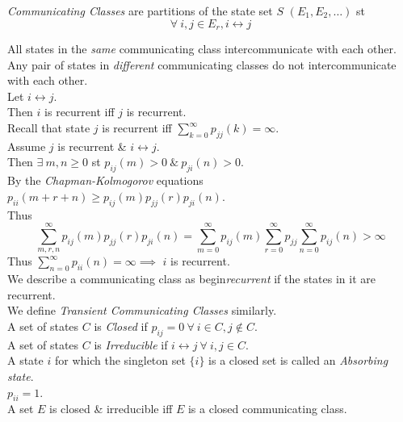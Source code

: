 \documentclass[11pt,a4paper]{article}
\begin{document}
\textit{Communicating Classes} are partitions of the state set $S$ $(E_1,E_2,\dots)$ st
$$\forall\ i,j\in E_r, i\leftrightarrow j$$

All states in the \textit{same} communicating class intercommunicate with each other.\\
Any pair of states in \textit{different} communicating classes do not intercommunicate with each other.\\

Let $i\leftrightarrow j$.\\
Then $i$ is recurrent iff $j$ is recurrent.\\

Recall that state $j$ is recurrent iff $\sum_{k=0}^\infty p_{jj}(k)=\infty$.\\
Assume $j$ is recurrent \& $i\leftrightarrow j$.\\
Then $\exists\ m,n\geq0$ st $p_{ij}(m)>0\ \&\ p_{ji}(n)>0$.\\
By the \textit{Chapman-Kolmogorov} equations $p_{ii}(m+r+n)\geq p_{ij}(m)p_{jj}(r)p_{ji}(n)$.\\
Thus
$$\sum_{m,r,n}^\infty p_{ij}(m)p_{jj}(r)p_{ji}(n)=\sum_{m=0}^\infty p_{ij}(m)\sum_{r=0}^\infty p_{jj}\sum_{n=0}^\infty p_{ij}(n)>\infty$$
Thus $\sum_{n=0}^\infty p_{ii}(n)=\infty\implies$ $i$ is recurrent.\\

We describe a communicating class as begin\textit{recurrent} if the states in it are recurrent.\\
\nb We define \textit{Transient Communicating Classes} similarly.\\

A set of states $C$ is \textit{Closed} if $p_{ij}=0\ \forall\ i\in C,j\not\in C$.\\

A set of states $C$ is \textit{Irreducible} if $i\leftrightarrow j\ \forall\ i,j\in C$.\\
 
A state $i$ for which the singleton set $\{i\}$ is a closed set is called an \textit{Absorbing state}.\\
\nb $p_{ii}=1$.\\

A set $E$ is closed \& irreducible iff $E$ is a closed communicating class.\\
\end{document}
